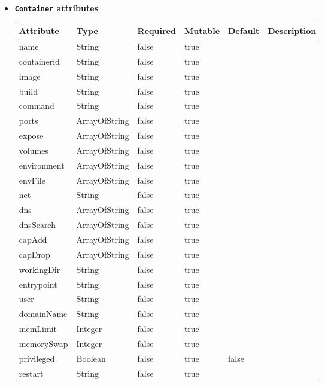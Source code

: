 \begin{itemize}
\item \textbf{\texttt{Container} attributes}

\begin{tabularx}{\textwidth}{|l|l|p{1.4cm}|p{1.3cm}|l|X|}
  \hline
  \textbf{Attribute} & \textbf{Type} & \textbf{Required} & \textbf{Mutable} & \textbf{Default} & \textbf{Description} \\
  \hline  
  name & String & false & true &  &  \\
  \hline
  containerid & String & false & true &  &  \\
  \hline
  image & String & false & true &  &  \\
  \hline
  build & String & false & true &  &  \\
  \hline
  command & String & false & true &  &  \\
  \hline
  ports & ArrayOfString & false & true &  &  \\
  \hline
  expose & ArrayOfString & false & true &  &  \\
  \hline
  volumes & ArrayOfString & false & true &  &  \\
  \hline
  environment & ArrayOfString & false & true &  &  \\
  \hline
  envFile & ArrayOfString & false & true &  &  \\
  \hline
  net & String & false & true &  &  \\
  \hline
  dns & ArrayOfString & false & true &  &  \\
  \hline
  dnsSearch & ArrayOfString & false & true &  &  \\
  \hline
  capAdd & ArrayOfString & false & true &  &  \\
  \hline
  capDrop & ArrayOfString & false & true &  &  \\
  \hline
  workingDir & String & false & true &  &  \\
  \hline
  entrypoint & String & false & true &  &  \\
  \hline
  user & String & false & true &  &  \\
  \hline
  domainName & String & false & true &  &  \\
  \hline
  memLimit & Integer & false & true &  &  \\
  \hline
  memorySwap & Integer & false & true &  &  \\
  \hline
  privileged & Boolean & false & true & false &  \\
  \hline
  restart & String & false & true &  &  \\

\end{tabularx}
\end{itemize}
